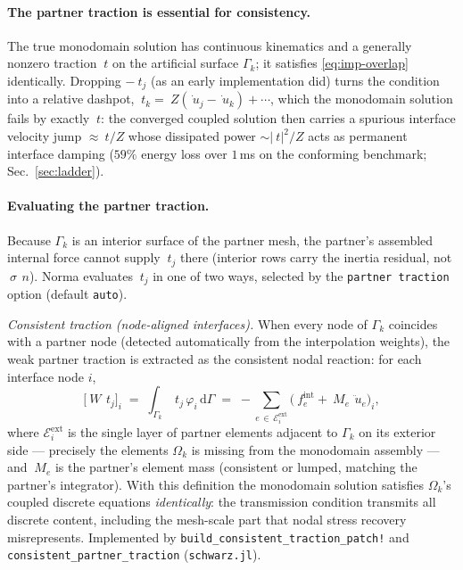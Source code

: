 \documentclass[11pt]{article}
\newcommand{\dd}{\mathrm{d}}
\newcommand{\code}[1]{\texttt{#1}}
\begin{document}
\paragraph{The partner traction is essential for consistency.} The true
monodomain solution has continuous kinematics and a generally nonzero
traction $~t$ on the artificial surface $\Gamma_k$; it satisfies
\eqref{eq:imp-overlap} identically. Dropping $-~t_j$ (as an early
implementation did) turns the condition into a relative dashpot,
$~t_k = ~Z(\dot{~u}_j - \dot{~u}_k) + \cdots$, which the monodomain solution
fails by exactly $~t$: the converged coupled solution then carries a
spurious interface velocity jump $\approx ~t/Z$ whose dissipated power
$\sim \lvert ~t \rvert^2/Z$ acts as permanent interface damping ($59\%$
energy loss over $1$\,ms on the conforming benchmark;
Sec.~\ref{sec:ladder}).

\paragraph{Evaluating the partner traction.} Because $\Gamma_k$ is an
interior surface of the partner mesh, the partner's assembled internal force
cannot supply $~t_j$ there (interior rows carry the inertia residual, not
$~\sigma\,~n$). Norma evaluates $~t_j$ in one of two ways, selected by
the \code{partner traction} option (default \code{auto}).

\emph{Consistent traction (node-aligned interfaces).} When every node of
$\Gamma_k$ coincides with a partner node (detected automatically from the
interpolation weights), the weak partner traction is extracted as the
consistent nodal reaction: for each interface node $i$,
\begin{equation}
  \bigl[ ~W\, ~t_j \bigr]_i
  \;=\; \int_{\Gamma_k} ~t_j\, \varphi_i \,\dd\Gamma
  \;=\; -\sum_{e \,\in\, \mathcal{E}_i^{\mathrm{ext}}}
     \bigl( ~f^{\mathrm{int}}_e + ~M_e\, \ddot{~u}_e \bigr)_i,
  \label{eq:consistent-traction}
\end{equation}
where $\mathcal{E}_i^{\mathrm{ext}}$ is the single layer of partner elements
adjacent to $\Gamma_k$ on its exterior side --- precisely the elements
$\Omega_k$ is missing from the monodomain assembly --- and $~M_e$ is the
partner's element mass (consistent or lumped, matching the partner's
integrator). With this definition the monodomain solution satisfies
$\Omega_k$'s coupled discrete equations \emph{identically}: the transmission
condition transmits all discrete content, including the mesh-scale part that
nodal stress recovery misrepresents. Implemented by
\code{build\_consistent\_traction\_patch!} and
\code{consistent\_partner\_traction} (\code{schwarz.jl}).
\end{document}
